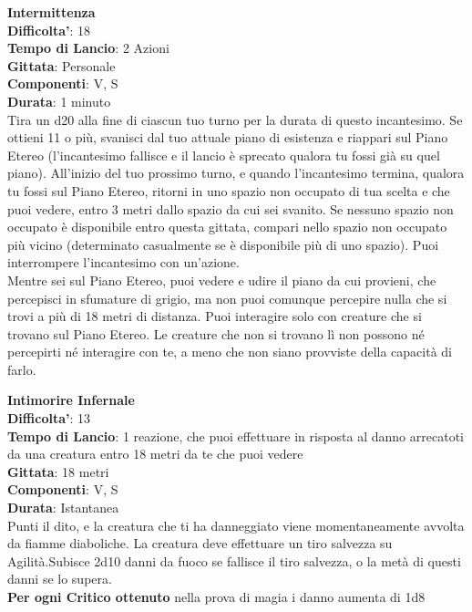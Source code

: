 \begin{multicols}{2}
\medskip\textbf{Intermittenza}\\
\textbf{Difficolta'}: 18\\
\textbf{Tempo di Lancio}: 2 Azioni\\
\textbf{Gittata}: Personale\\
\textbf{Componenti}: V, S\\
\textbf{Durata}: 1 minuto\\
Tira un d20 alla fine di ciascun tuo turno per la durata di questo incantesimo. Se ottieni 11 o più, svanisci dal tuo attuale piano di esistenza e riappari sul Piano Etereo (l’incantesimo fallisce e il lancio è sprecato qualora tu fossi già su quel piano). All’inizio del tuo prossimo turno, e quando l’incantesimo termina, qualora tu fossi sul Piano Etereo, ritorni in uno spazio non occupato di tua scelta e che puoi vedere, entro 3 metri dallo spazio da cui sei svanito. Se nessuno spazio non occupato è disponibile entro questa gittata, compari nello spazio non occupato più vicino (determinato casualmente se è disponibile più di uno spazio). Puoi interrompere l’incantesimo con un’azione.\\
Mentre sei sul Piano Etereo, puoi vedere e udire il piano da cui provieni, che percepisci in sfumature di grigio, ma non puoi comunque percepire nulla che si trovi a più di 18 metri di distanza. Puoi interagire solo con creature che si trovano sul Piano Etereo. Le creature che non si trovano lì non possono né percepirti né interagire con te, a meno che non siano provviste della capacità di farlo.

\medskip\textbf{Intimorire Infernale}\\
\textbf{Difficolta'}: 13\\
\textbf{Tempo di Lancio}: 1 reazione, che puoi effettuare in risposta al danno arrecatoti da una creatura entro 18 metri da te che puoi vedere\\
\textbf{Gittata}: 18 metri\\
\textbf{Componenti}: V, S\\
\textbf{Durata}: Istantanea\\
Punti il dito, e la creatura che ti ha danneggiato viene momentaneamente avvolta da fiamme diaboliche. La creatura deve effettuare un tiro salvezza su Agilità.Subisce 2d10 danni da fuoco se  fallisce il tiro salvezza, o la metà di questi danni se lo supera.\\
\textbf{Per ogni Critico ottenuto} nella prova di magia i danno aumenta di 1d8


\end{multicols}
